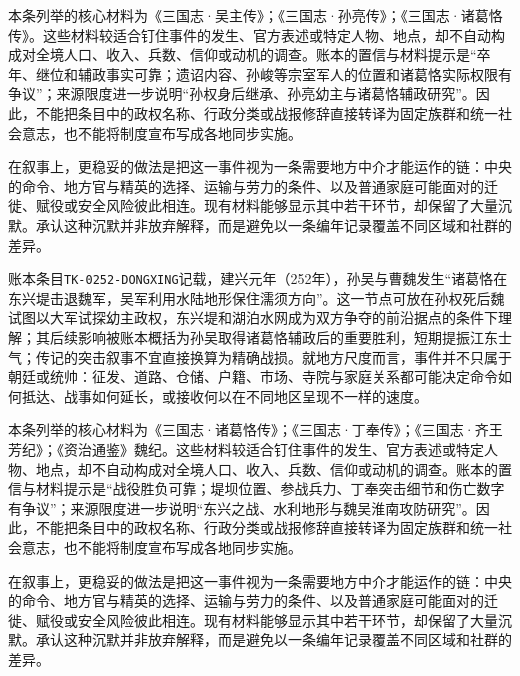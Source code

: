本条列举的核心材料为《三国志·吴主传》；《三国志·孙亮传》；《三国志·诸葛恪传》。这些材料较适合钉住事件的发生、官方表述或特定人物、地点，却不自动构成对全境人口、收入、兵数、信仰或动机的调查。账本的置信与材料提示是“卒年、继位和辅政事实可靠；遗诏内容、孙峻等宗室军人的位置和诸葛恪实际权限有争议”；来源限度进一步说明“孙权身后继承、孙亮幼主与诸葛恪辅政研究”。因此，不能把条目中的政权名称、行政分类或战报修辞直接转译为固定族群和统一社会意志，也不能将制度宣布写成各地同步实施。

在叙事上，更稳妥的做法是把这一事件视为一条需要地方中介才能运作的链：中央的命令、地方官与精英的选择、运输与劳力的条件、以及普通家庭可能面对的迁徙、赋役或安全风险彼此相连。现有材料能够显示其中若干环节，却保留了大量沉默。承认这种沉默并非放弃解释，而是避免以一条编年记录覆盖不同区域和社群的差异。

账本条目\texttt{TK-0252-DONGXING}记载，建兴元年（252年），孙吴与曹魏发生“诸葛恪在东兴堤击退魏军，吴军利用水陆地形保住濡须方向”。这一节点可放在孙权死后魏试图以大军试探幼主政权，东兴堤和湖泊水网成为双方争夺的前沿据点的条件下理解；其后续影响被账本概括为孙吴取得诸葛恪辅政后的重要胜利，短期提振江东士气；传记的突击叙事不宜直接换算为精确战损。就地方尺度而言，事件并不只属于朝廷或统帅：征发、道路、仓储、户籍、市场、寺院与家庭关系都可能决定命令如何抵达、战事如何延长，或接收何以在不同地区呈现不一样的速度。

本条列举的核心材料为《三国志·诸葛恪传》；《三国志·丁奉传》；《三国志·齐王芳纪》；《资治通鉴》魏纪。这些材料较适合钉住事件的发生、官方表述或特定人物、地点，却不自动构成对全境人口、收入、兵数、信仰或动机的调查。账本的置信与材料提示是“战役胜负可靠；堤坝位置、参战兵力、丁奉突击细节和伤亡数字有争议”；来源限度进一步说明“东兴之战、水利地形与魏吴淮南攻防研究”。因此，不能把条目中的政权名称、行政分类或战报修辞直接转译为固定族群和统一社会意志，也不能将制度宣布写成各地同步实施。

在叙事上，更稳妥的做法是把这一事件视为一条需要地方中介才能运作的链：中央的命令、地方官与精英的选择、运输与劳力的条件、以及普通家庭可能面对的迁徙、赋役或安全风险彼此相连。现有材料能够显示其中若干环节，却保留了大量沉默。承认这种沉默并非放弃解释，而是避免以一条编年记录覆盖不同区域和社群的差异。
